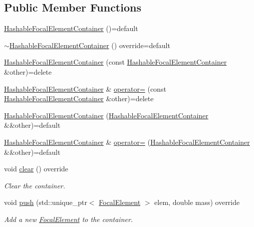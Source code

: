 \subsection*{Public Member Functions}
\begin{DoxyCompactItemize}
\item 
\hyperlink{classHashableFocalElementContainer_a59ef0e4b071a31c9ec4d12b265966459}{Hashable\+Focal\+Element\+Container} ()=default
\item 
\hyperlink{classHashableFocalElementContainer_a105af5bcdf825c1ac55b2d36abe691eb}{$\sim$\+Hashable\+Focal\+Element\+Container} () override=default
\item 
\hyperlink{classHashableFocalElementContainer_a45b0628e9bd91e6f2bd0c574e7958579}{Hashable\+Focal\+Element\+Container} (const \hyperlink{classHashableFocalElementContainer}{Hashable\+Focal\+Element\+Container} \&other)=delete
\item 
\hyperlink{classHashableFocalElementContainer}{Hashable\+Focal\+Element\+Container} \& \hyperlink{classHashableFocalElementContainer_aa1e05287cf51b5480ba4ec7f8a63476d}{operator=} (const \hyperlink{classHashableFocalElementContainer}{Hashable\+Focal\+Element\+Container} \&other)=delete
\item 
\hyperlink{classHashableFocalElementContainer_acbb66df9fd4caec000da0d07957192dc}{Hashable\+Focal\+Element\+Container} (\hyperlink{classHashableFocalElementContainer}{Hashable\+Focal\+Element\+Container} \&\&other)=default
\item 
\hyperlink{classHashableFocalElementContainer}{Hashable\+Focal\+Element\+Container} \& \hyperlink{classHashableFocalElementContainer_ad66a0f24eb49efdc08450d0885c6de9e}{operator=} (\hyperlink{classHashableFocalElementContainer}{Hashable\+Focal\+Element\+Container} \&\&other)=default
\item 
void \hyperlink{classHashableFocalElementContainer_a352c7bc7f6b705bd1a5d5e5b9ec225fe}{clear} () override
\begin{DoxyCompactList}\small\item\em Clear the container. \end{DoxyCompactList}\item 
void \hyperlink{classHashableFocalElementContainer_a896a7b5c2719e63b1ad8a53a6d33c6c7}{push} (std\+::unique\+\_\+ptr$<$ \hyperlink{classFocalElement}{Focal\+Element} $>$ elem, double mass) override
\begin{DoxyCompactList}\small\item\em Add a new \hyperlink{classFocalElement}{Focal\+Element} to the container. \end{DoxyCompactList}\item 

\end{DoxyCompactItemize}
